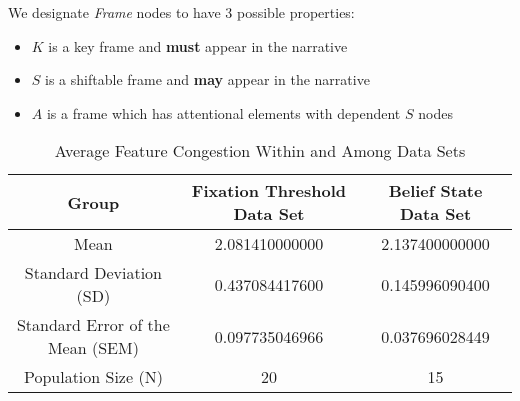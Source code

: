 We designate \textit{Frame} nodes to have 3 possible properties:
\begin{itemize}
 \setlength\itemsep{-0.5em}
 \item $K$ is a key frame and \textbf{must} appear in the narrative
 \item $S$ is a shiftable frame and \textbf{may} appear in the narrative
 \item $A$ is a frame which has attentional elements with dependent $S$ nodes
\end{itemize}


\begin{table}[h!]
  \begin{center}
    \begin{tabular}{| c || c | c |}
    \hline
    Group & Fixation Threshold Data Set & Belief State Data Set \\ \hline \hline
    Mean & 2.081410000000 & 2.137400000000 \\ \hline
    Standard Deviation (SD) & 0.437084417600 & 0.145996090400  \\ \hline
    Standard Error of the Mean (SEM) & 0.097735046966 & 0.037696028449 \\ \hline
    Population Size (N) & 20 & 15  \\
    \hline
    \end{tabular}
  \end{center}
  \caption{Average Feature Congestion Within and Among Data Sets}
\end{table}
